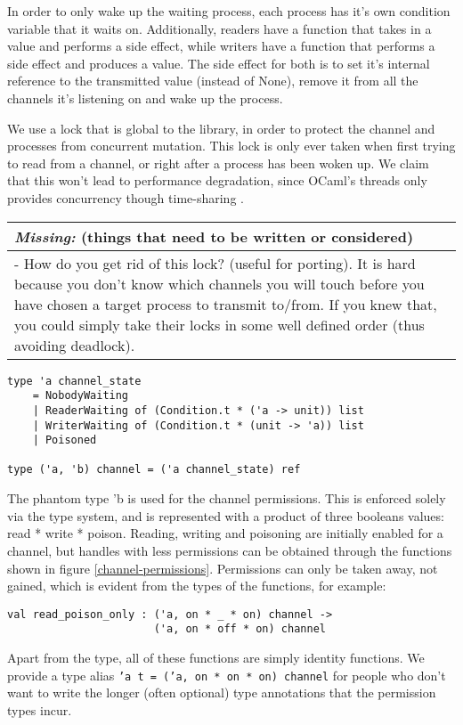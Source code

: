 \documentclass[a4paper,12pt]{article}
\newcommand{\missing}[1]{
\begin{tabular}{|p{11cm}|}
\hline
\emph{Missing:} {\scriptsize (things that need to be written or considered)} \\
\hline
#1
\hline
\end{tabular}
}
\begin{document}
In order to only wake up the waiting process, each process has it's own condition variable that
it waits on. Additionally, readers have a function that takes in a value and performs a side 
effect, while writers have a function that performs a side effect and produces a value. The side
effect for both is to set it's internal reference to the transmitted value (instead of None),
remove it from all the channels it's listening on and wake up the process.

We use a lock that is global to the library, in order to protect the channel and processes from
concurrent mutation. This lock is only ever taken when first trying to read from a channel, or
right after a process has been woken up. We claim that this won't lead to performance degradation,
since OCaml's threads only provides concurrency though time-sharing \cite{ocaml-threads}.

\missing{
- How do you get rid of this lock? (useful for porting). It is hard because you don't know which
channels you will touch before you have chosen a target process to transmit to/from. If you knew
that, you could simply take their locks in some well defined order (thus avoiding deadlock). \\
}

\begin{verbatim}
type 'a channel_state
    = NobodyWaiting 
    | ReaderWaiting of (Condition.t * ('a -> unit)) list
    | WriterWaiting of (Condition.t * (unit -> 'a)) list
    | Poisoned

type ('a, 'b) channel = ('a channel_state) ref
\end{verbatim}

The phantom type 'b is used for the channel permissions. This is enforced solely via the type
system, and is represented with a product of three booleans values: read * write * poison.
Reading, writing and poisoning are initially enabled for a channel, but handles with less 
permissions can be obtained through the functions shown in figure \ref{channel-permissions}. 
Permissions can only be taken away, not gained, which is evident from the types of the 
functions, for example: 

\begin{verbatim}
val read_poison_only : ('a, on * _ * on) channel -> 
                       ('a, on * off * on) channel
\end{verbatim}

Apart from the type, all of these functions are simply identity functions. We provide a
type alias \texttt{'a t = ('a, on * on * on) channel} for people who don't want to write the
longer (often optional) type annotations that the permission types incur.
\end{document}
